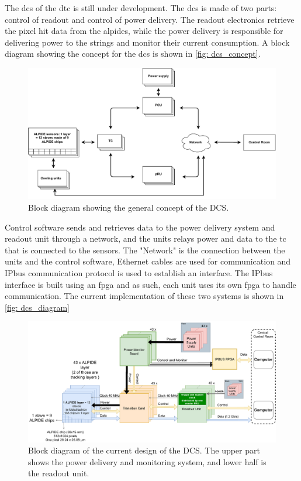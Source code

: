 \documentclass[main.tex]{subfiles}
\begin{document}
The \gls{dcs} of the \gls{dtc} is still under development. The \gls{dcs} is made of two parts: control of readout and control of power delivery. The readout electronics retrieve the pixel hit data from the \gls{alpide}s, while the power delivery is responsible for delivering power to the strings and monitor their current consumption. A block diagram showing the concept for the \gls{dcs} is shown in \autoref{fig: dcs_concept}.

\begin{figure}[!ht]
    \centering
    \includegraphics[width=15cm]{images/dcs_concept_renewed.pdf}
    \caption{Block diagram showing the general concept of the DCS.}
    \label{fig: dcs_concept}
\end{figure}
\FloatBarrier

Control software sends and retrieves data to the power delivery system and readout unit through a network, and the units relays power and data to the \gls{tc} that is connected to the sensors. The "Network" is the connection between the units and the control software, Ethernet cables are used for communication and IPbus communication protocol is used to establish an interface. The IPbus interface is built using an \gls{fpga} and as such, each unit uses its own \gls{fpga} to handle communication. The current implementation of these two systems is shown in \autoref{fig: dcs_diagram}

\begin{figure}[!ht]
    \centering
    \includegraphics[scale=0.4]{images/pCT_Current_layout-CurrentSystemOverview.pdf}
    \caption{Block diagram of the current design of the DCS. The upper part shows the power delivery and monitoring system, and lower half is the readout unit.}
    \label{fig: dcs_diagram}
\end{figure}
\FloatBarrier
\end{document}
